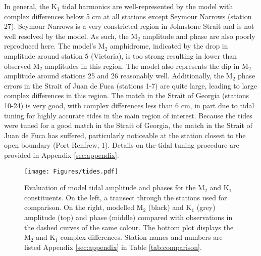 \documentclass[letterpaper]{tATO2e}
\begin{document}
In general, the K$_1$ tidal harmonics are well-represented by the model with complex differences below 5 cm at all stations except Seymour Narrows (station 27). Seymour Narrows is a very constricted region in Johnstone Strait and is not well resolved by the model. As such, the M$_2$ amplitude and phase are also poorly reproduced here.  The model's M$_2$ amphidrome, indicated by the drop in amplitude around station 5 (Victoria), is too strong resulting in lower than observed M$_2$ amplitudes in this region. {\color{red} The model also represents the dip in M$_2$ amplitude around stations 25 and 26 reasonably well.} Additionally, the M$_2$ phase errors in the Strait of Juan de Fuca (stations 1-7) are quite large, leading to large complex differences in this region.  The match in the Strait of Georgia (stations 10-24) is very good, with complex differences less than 6 cm, in part due to tidal tuning for highly accurate tides in the main region of interest.  {\color{red}Because the tides were tuned for a good match in the Strait of Georgia, the match in the Strait of Juan de Fuca has suffered, particularly noticeable at the station closest to the open boundary (Port Renfrew, 1). } Details on the tidal tuning procedure are provided in Appendix \ref{sec:appendix}.


\begin{figure}
\centering
\texttt{[image: Figures/tides.pdf]}
\caption{Evaluation of model tidal amplitude and phases for the M$_2$ and K$_1$ constituents. On the left, a transect through the stations used for comparison. On the right, modelled M$_2$ (black) and K$_1$ (grey) amplitude (top) and phase (middle) compared with observations in the dashed curves of the same colour. The bottom plot displays the M$_2$ and K$_1$ complex differences. Station names and numbers are listed Appendix \ref{sec:appendix} in Table \ref{tab:comparison}.}
\label{fig:tides}
\end{figure}
\end{document}
